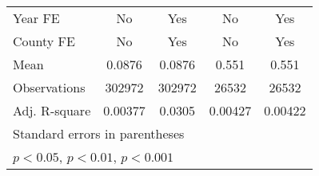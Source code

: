 \begin{table}[htbp]
{\begin{tabular}{l*{4}{c}}
            Year FE                 & No                                   & Yes                                  & No                                   & Yes                                  \\
            County FE               & No                                   & Yes                                  & No                                   & Yes                                  \\
            \midrule
            Mean                    & 0.0876                               & 0.0876                               & 0.551                                & 0.551                                \\
            Observations            & 302972                               & 302972                               & 26532                                & 26532                                \\
            Adj. R-square           & 0.00377                              & 0.0305                               & 0.00427                              & 0.00422                              \\
            \bottomrule
            \multicolumn{5}{l}{\footnotesize Standard errors in parentheses}                                                                                                                    \\
            \multicolumn{5}{l}{\footnotesize \sym{*} \(p<0.05\), \sym{**} \(p<0.01\), \sym{***} \(p<0.001\)}                                                                                    \\
        \end{tabular}

    }
\end{table}